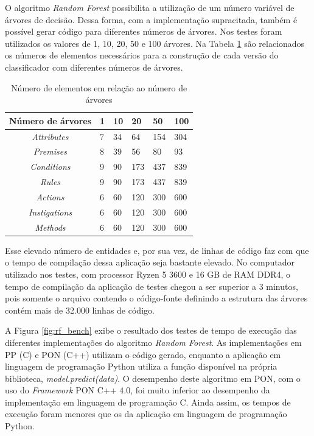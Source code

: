 O algoritmo \textit{Random Forest} possibilita a utilização de um número
variável de árvores de decisão. Dessa forma, com a implementação supracitada,
também é possível gerar código para diferentes números de árvores. Nos testes
foram utilizados os valores de 1, 10, 20, 50 e 100 árvores. Na Tabela
\ref{tab:elementos_arvores} são relacionados os números de elementos necessários
para a construção de cada versão do classificador com diferentes números de
árvores.

\begin{table}[!htb]
\centering
\label{tab:elementos_arvores}
\smallskip
\begin{tabularx}{0.8\textwidth}{|c|X|X|X|X|X|}
\hline
\textbf{Número de árvores} & 1 & 10 & 20 & 50 & 100\\
\hline
\hline
\textit{Attributes} & 7 & 34 & 64 & 154 & 304 \\
\hline
\textit{Premises} & 8 & 39 & 56 & 80 & 93 \\
\hline
\textit{Conditions} & 9 & 90 & 173 & 437 & 839 \\
\hline
\textit{Rules} & 9 & 90 & 173 & 437 & 839 \\
\hline
\textit{Actions} & 6 & 60 & 120 & 300 & 600 \\
\hline
\textit{Instigations} & 6 & 60 & 120 & 300 & 600 \\
\hline
\textit{Methods} & 6 & 60 & 120 & 300 & 600 \\
\hline
\end{tabularx}
\caption{Número de elementos em relação ao número de árvores}
\end{table}

Esse elevado número de entidades e, por sua vez, de linhas de código faz com que
o tempo de compilação dessa aplicação seja bastante elevado. No computador
utilizado nos testes, com processor Ryzen 5 3600 e 16 GB de RAM DDR4, o tempo de
compilação da aplicação de testes chegou a ser superior a 3 minutos, pois
somente o arquivo contendo o código-fonte definindo a estrutura das árvores
contém mais de 32.000 linhas de código.

A Figura \ref{fig:rf_bench} exibe o resultado dos testes de tempo de execução
das diferentes implementações do algoritmo \textit{Random Forest}. As
implementações em PP (C) e PON (C++) utilizam o código gerado, enquanto a
aplicação em linguagem de programação Python utiliza a função disponível na
própria biblioteca, \textit{model.predict(data)}. O desempenho deste algoritmo
em PON, com o uso do \textit{Framework} PON C++ 4.0, foi muito inferior ao
desempenho da implementação em linguagem de programação C. Ainda assim, os
tempos de execução foram menores que os da aplicação em linguagem de programação
Python.

